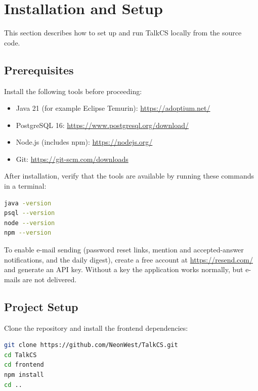 \section{Installation and Setup}
\label{sec:install}

This section describes how to set up and run TalkCS locally from the source code.

\subsection{Prerequisites}

Install the following tools before proceeding:

\begin{itemize}
  \item Java 21 (for example Eclipse Temurin): \url{https://adoptium.net/}
  \item PostgreSQL 16: \url{https://www.postgresql.org/download/}
  \item Node.js (includes npm): \url{https://nodejs.org/}
  \item Git: \url{https://git-scm.com/downloads}
\end{itemize}

After installation, verify that the tools are available by running these commands in
a terminal:

\begin{lstlisting}[language=bash,caption={Verifying the installed tools},label={lst:verify}]
java -version
psql --version
node --version
npm --version
\end{lstlisting}

To enable e-mail sending (password reset links, mention and accepted-answer
notifications, and the daily digest), create a free account at
\url{https://resend.com/} and generate an API key. Without a key the application
works normally, but e-mails are not delivered.

\subsection{Project Setup}

Clone the repository and install the frontend dependencies:

\begin{lstlisting}[language=bash,caption={Cloning the repository and installing dependencies},label={lst:clone}]
git clone https://github.com/NeonWest/TalkCS.git
cd TalkCS
cd frontend
npm install
cd ..
\end{lstlisting}

